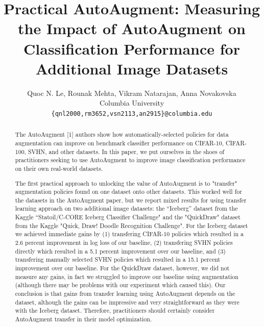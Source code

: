\documentclass[10pt,twocolumn,letterpaper]{article}
\begin{document}
\title{Practical AutoAugment: Measuring the Impact of AutoAugment on Classification Performance for Additional Image Datasets}

\author{Quoc N. Le, Rounak Mehta, Vikram Natarajan, Anna Novakovska\\
Columbia University\\
{\tt\small \{qnl2000,rm3652,vsn2113,an2915\}@columbia.edu}
\\
}

\maketitle

\begin{abstract}
The AutoAugment [1] authors show how automatically-selected policies for data augmentation can improve on benchmark classifier performance on CIFAR-10, CIFAR-100, SVHN, and other datasets.  In this paper, we put ourselves in the shoes of practitioners seeking to use AutoAugment to improve image classification performance on their own real-world datasets.

The first practical approach to unlocking the value of AutoAugment is to "transfer" augmentation policies found on one dataset onto other datasets. This worked well for the datasets in the AutoAugment paper, but we report mixed results for using transfer learning approach on two additional image datasets: the “Iceberg” dataset from the Kaggle “Statoil/C-CORE Iceberg Classifier Challenge" and the "QuickDraw" dataset from the Kaggle "Quick, Draw! Doodle Recognition Challenge".  For the Iceberg dataset we achieved immediate gains by (1) transfering CIFAR-10 policies which resulted in a 2.6 percent improvement in log loss of our baseline, (2) transfering SVHN policies directly which resulted in a 5.1 percent improvement over our baseline, and (3) transfering manually selected SVHN policies which resulted in a 15.1 percent improvement over our baseline.  For the QuickDraw dataset, however, we did not measure any gains, in fact we struggled to improve our baseline using augmentation (although there may be problems with our experiment which caused this).  Our conclusion is that gains from transfer learning using AutoAugment depends on the dataset, although the gains can be impressive and very straightforward as they were with the Iceberg dataset.  Therefore, practitioners should certainly consider AutoAugment transfer in their model optimization.


\end{abstract}
\end{document}
